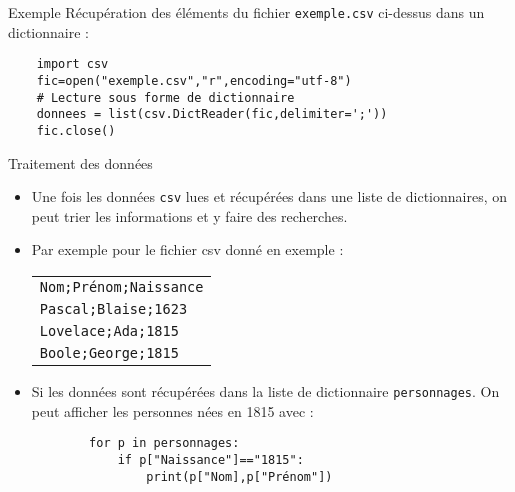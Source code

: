 \documentclass[10pt]{beamer}
\begin{document}
\begin{frame}[fragile]
	\mframe{\DB}
	\begin{exampleblock}{Exemple}
		Récupération des éléments du fichier {\tt exemple.csv} ci-dessus dans un dictionnaire :
		\begin{lstlisting}	
	import csv
	fic=open("exemple.csv","r",encoding="utf-8")
	# Lecture sous forme de dictionnaire 
	donnees = list(csv.DictReader(fic,delimiter=';'))
	fic.close()
	\end{lstlisting}
	\end{exampleblock}
\end{frame}


\begin{frame}[fragile]
	\mframe{\DB}
	\begin{block}{Traitement des données}
		\begin{itemize}
			\item<1-> Une fois les données {\tt csv} lues et récupérées dans une liste de dictionnaires, on peut trier les informations et y faire des recherches.
			\item<2-> Par exemple pour le fichier csv donné en exemple :
			      \begin{tabular}{|l|}
				      \hline
				      {\tt Nom;Prénom;Naissance} \\
				      {\tt Pascal;Blaise;1623}   \\
				      {\tt Lovelace;Ada;1815}    \\
				      {\tt Boole;George;1815}    \\
				      \hline
			      \end{tabular}
			\item<3-> Si les données sont récupérées dans la liste de dictionnaire {\tt personnages}. On peut afficher les personnes nées en 1815 avec :
			      \begin{lstlisting}
    	for p in personnages:
    		if p["Naissance"]=="1815":
    			print(p["Nom],p["Prénom"])
    \end{lstlisting}
		\end{itemize}
	\end{block}
\end{frame}
\end{document}
